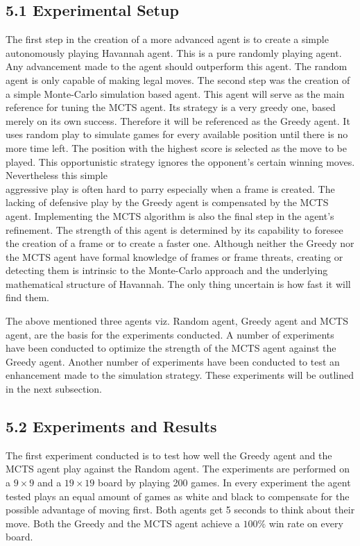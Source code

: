 \documentclass[10pt]{article}
\begin{document}
\subsection*{5.1 Experimental Setup}
The first step in the creation of a more advanced agent is to create a simple autonomously playing Havannah agent. This is a pure randomly playing agent. Any advancement made to the agent should outperform this agent. The random agent is only capable of making legal moves. The second step was the creation of a simple Monte-Carlo simulation based agent. This agent will serve as the main reference for tuning the MCTS agent. Its strategy is a very greedy one, based merely on its own success. Therefore it will be referenced as the Greedy agent. It uses random play to simulate games for every available position until there is no more time left. The position with the highest score is selected as the move to be played. This opportunistic strategy ignores the opponent's certain winning moves. Nevertheless this simple\\
aggressive play is often hard to parry especially when a frame is created. The lacking of defensive play by the Greedy agent is compensated by the MCTS agent. Implementing the MCTS algorithm is also the final step in the agent's refinement. The strength of this agent is determined by its capability to foresee the creation of a frame or to create a faster one. Although neither the Greedy nor the MCTS agent have formal knowledge of frames or frame threats, creating or detecting them is intrinsic to the Monte-Carlo approach and the underlying mathematical structure of Havannah. The only thing uncertain is how fast it will find them.

The above mentioned three agents viz. Random agent, Greedy agent and MCTS agent, are the basis for the experiments conducted. A number of experiments have been conducted to optimize the strength of the MCTS agent against the Greedy agent. Another number of experiments have been conducted to test an enhancement made to the simulation strategy. These experiments will be outlined in the next subsection.

\subsection*{5.2 Experiments and Results}
The first experiment conducted is to test how well the Greedy agent and the MCTS agent play against the Random agent. The experiments are performed on a $9 \times 9$ and a $19 \times 19$ board by playing 200 games. In every experiment the agent tested plays an equal amount of games as white and black to compensate for the possible advantage of moving first. Both agents get 5 seconds to think about their move. Both the Greedy and the MCTS agent achieve a $100 \%$ win rate on every board.
\end{document}
